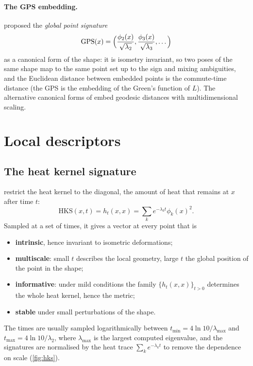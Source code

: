 \paragraph{The GPS embedding.} \citet{Rustamov2007} proposed the \emph{global point signature}
\begin{equation}
\mathrm{GPS}(x)=\Bigl(\frac{\phi_2(x)}{\sqrt{\lambda_2}},\frac{\phi_3(x)}{\sqrt{\lambda_3}},\dots\Bigr)
\end{equation}
as a canonical form of the shape: it is isometry invariant, so two poses of the same shape map to the
same point set up to the sign and mixing ambiguities, and the Euclidean distance between embedded
points is the commute-time distance (the GPS is the embedding of the Green's function of $L$). The
alternative canonical forms of \citet{Elad2003} embed geodesic distances with multidimensional scaling.


\section{Local descriptors}

\subsection{The heat kernel signature}

\citet{Sun2009} restrict the heat kernel to the diagonal, the amount of heat that remains at $x$ after
time $t$:
\begin{equation}
\mathrm{HKS}(x,t)=h_t(x,x)=\sum_ke^{-\lambda_kt}\phi_k(x)^2 .
\end{equation}
Sampled at a set of times, it gives a vector at every point that is
\begin{itemize}
  \item \textbf{intrinsic}, hence invariant to isometric deformations;
  \item \textbf{multiscale}: small $t$ describes the local geometry, large $t$ the global position of the
  point in the shape;
  \item \textbf{informative}: under mild conditions the family $\{h_t(x,x)\}_{t>0}$ determines the
  whole heat kernel, hence the metric;
  \item \textbf{stable} under small perturbations of the shape.
\end{itemize}
The times are usually sampled logarithmically between $t_{\min}=4\ln10/\lambda_{\max}$ and
$t_{\max}=4\ln10/\lambda_2$, where $\lambda_{\max}$ is the largest computed eigenvalue, and the
signatures are normalised by the heat trace $\sum_ke^{-\lambda_kt}$ to remove the dependence on scale
(\cref{fig:hks}).

